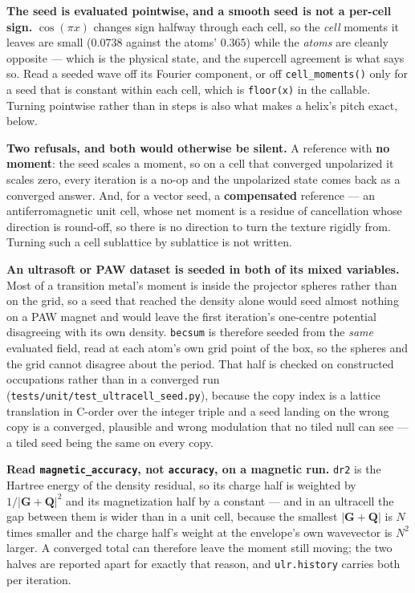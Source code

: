 \documentclass[11pt,a4paper]{article}
\newcommand{\code}[1]{\texttt{\small #1}}
\begin{document}
\textbf{The seed is evaluated pointwise, and a smooth seed is not a per-cell
sign.} $\cos(\pi x)$ changes sign halfway through each cell, so the
\emph{cell} moments it leaves are small ($0.0738$ against the atoms'
$0.365$) while the \emph{atoms} are cleanly opposite --- which is the physical
state, and the supercell agreement is what says so. Read a seeded wave off its
Fourier component, or off \code{cell\_moments()} only for a seed that is
constant within each cell, which is \code{floor(x)} in the callable. Turning
pointwise rather than in steps is also what makes a helix's pitch exact, below.

\textbf{Two refusals, and both would otherwise be silent.} A reference with
\textbf{no moment}: the seed scales a moment, so on a cell that converged
unpolarized it scales zero, every iteration is a no-op and the unpolarized state
comes back as a converged answer. And, for a vector seed, a \textbf{compensated}
reference --- an antiferromagnetic unit cell, whose net moment is a residue of
cancellation whose direction is round-off, so there is no direction to turn the
texture rigidly from. Turning such a cell sublattice by sublattice is not
written.

\textbf{An ultrasoft or PAW dataset is seeded in both of its mixed variables.}
Most of a transition metal's moment is inside the projector spheres rather than
on the grid, so a seed that reached the density alone would seed almost nothing
on a PAW magnet and would leave the first iteration's one-centre potential
disagreeing with its own density. \code{becsum} is therefore seeded from the
\emph{same} evaluated field, read at each atom's own grid point of the box, so
the spheres and the grid cannot disagree about the period. That half is checked
on constructed occupations rather than in a converged run
(\code{tests/unit/test\_ultracell\_seed.py}), because the copy index is a
lattice translation in C-order over the integer triple and a seed landing on the
wrong copy is a converged, plausible and wrong modulation that no tiled null can
see --- a tiled seed being the same on every copy.

\textbf{Read \code{magnetic\_accuracy}, not \code{accuracy}, on a magnetic
run.} \code{dr2} is the Hartree energy of the density residual, so its charge
half is weighted by $1/|\mathbf G+\mathbf Q|^2$ and its magnetization half by a
constant --- and in an ultracell the gap between them is wider than in a unit
cell, because the smallest $|\mathbf G + \mathbf Q|$ is $N$ times smaller and
the charge half's weight at the envelope's own wavevector is $N^2$ larger. A
converged total can therefore leave the moment still moving; the two halves are
reported apart for exactly that reason, and \code{ulr.history} carries both per
iteration.
\end{document}
